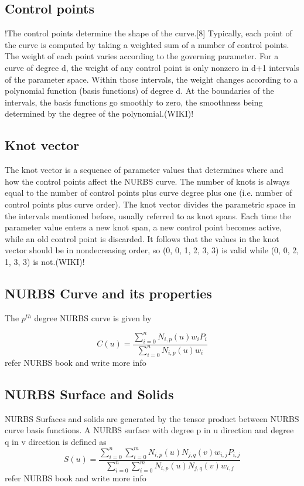 \documentclass[12pt]{article}
\begin{document}
\subsection{Control points }
!The control points determine the shape of the curve.[8] Typically, each point of the curve is computed by taking a weighted sum of a number of control points. The weight of each point varies according to the governing parameter. For a curve of degree d, the weight of any control point is only nonzero in d+1 intervals of the parameter space. Within those intervals, the weight changes according to a polynomial function (basis functions) of degree d. At the boundaries of the intervals, the basis functions go smoothly to zero, the smoothness being determined by the degree of the polynomial.(WIKI)!

\subsection{Knot vector }
The knot vector is a sequence of parameter values that determines where and how the control points affect the NURBS curve. The number of knots is always equal to the number of control points plus curve degree plus one (i.e. number of control points plus curve order). The knot vector divides the parametric space in the intervals mentioned before, usually referred to as knot spans. Each time the parameter value enters a new knot span, a new control point becomes active, while an old control point is discarded. It follows that the values in the knot vector should be in nondecreasing order, so (0, 0, 1, 2, 3, 3) is valid while (0, 0, 2, 1, 3, 3) is not.(WIKI)!
\subsection{NURBS Curve and its properties }
The $p^{th}$ degree NURBS curve is given by

\begin{equation}
C(u) = \frac{\sum_{i=0}^{n}N_{i,p}(u)w_{i}P_{i}}{\sum_{i=0}^{n}N_{i,p}(u)w_{i}}
\end{equation}
refer NURBS book and write more info
\subsection{NURBS Surface and Solids }
NURBS Surfaces and solids are generated by the tensor product between NURBS curve basis functions.
A NURBS surface with degree p in u direction and degree q in v direction is defined as
\begin{equation}
S(u) = \frac{\sum_{i=0}^{n}\sum_{i=0}^{m}N_{i,p}(u)N_{j,q}(v)w_{i,j}P_{i,j}}{\sum_{i=0}^{n}\sum_{i=0}^{m}N_{i,p}(u)N_{j,q}(v)w_{i,j}}
\end{equation}
refer NURBS book and write more info
\end{document}
